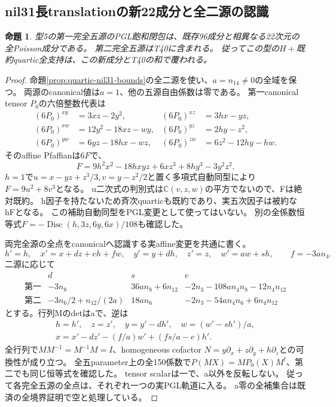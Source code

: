 \documentclass[a4paper,11pt]{ltjsarticle}
\newtheorem{proposition}{命題}[section]
\theoremstyle{definition}
\begin{document}
\subsection{nil31長translationの新22成分と全二源の認識}
\begin{proposition}\label{prop:nil31-long-quartic-component}
型5の第一完全五源のPGL飽和閉包は、既存96成分と相異なる22次元の全Poisson成分である。
第二完全五源はT40に含まれる。
従ってこの型の$H+$既約quartic全支持は、この新成分とT40の和で覆われる。
\end{proposition}
\begin{proof}
命題\ref{prop:quartic-nil31-bounds}の全二源を使い、$a=n_{14}\ne0$の全域を保つ。
両源のcanonical値は$a=1$、他の五源自由係数は零である。
第一canonical tensor $P_0$の六倍整数代表は
\[
\begin{aligned}
 (6P_0)^{xy}&=3xz-2y^2,&(6P_0)^{xz}&=3hx-yz,\\
 (6P_0)^{xw}&=12y^2-18xz-wy,&(6P_0)^{yz}&=2hy-z^2,\\
 (6P_0)^{yw}&=6yz-18hx-wz,&(6P_0)^{zw}&=6z^2-12hy-hw.
\end{aligned}
\]
そのaffine Pfaffianは$6F$で、
\[
 F=9h^2x^2-18hxyz+6xz^3+8hy^3-3y^2z^2.
\]
$h=1$で$u=x-yz+z^3/3,v=y-z^2/2$と置く多項式自動同型により$F=9u^2+8v^3$となる。
u二次式の判別式は$\mathbb C(v,z,w)$の平方でないので、Fは絶対既約。
h因子を持たないため斉次quarticも既約であり、実五次因子は被約なhFとなる。
この補助自動同型をPGL変更として使ってはいない。
別の全係数恒等式$F=-\operatorname{Disc}(h,3z,6y,6x)/108$も確認した。

両完全源の全点をcanonicalへ認識する実affine変更を共通に書く。
\[
 h'=h,\quad x'=x+dz+eh+fw,\quad y'=y+dh,\quad z'=z,\quad w'=aw+sh,
 \qquad f=-3an_4.
\]
二源に応じて
\[
\begin{array}{c|c|c|c}
 &d&s&e\\\hline
 \text{第一}&-3n_8&36an_8+6n_{12}&-2n_3-108an_4n_8-12n_4n_{12}\\
 \text{第二}&-3n_6/2+n_{12}/(2a)&18an_6&-2n_3-54an_4n_6+6n_4n_{12}
\end{array}
\]
とする。行列Mのdetはaで、逆は
\[
 \begin{gathered}
 h=h',\quad z=z',\quad y=y'-dh',\quad w=(w'-sh')/a,\\
 x=x'-dz'-(f/a)w'+(fs/a-e)h'.
 \end{gathered}
\]
全行列で$MM^{-1}=M^{-1}M=I$、homogeneous cofactor
$N=y\partial_x+z\partial_y+h\partial_z$との可換性が成り立つ。
全五parameter上の全150係数で$P(MX)=MP_0(X)M^t$、第二でも同じ恒等式を確認した。
tensor scalarは一で、a以外を反転しない。
従って各完全五源の全点は、それぞれ一つの実PGL軌道に入る。
a零の全補集合は既済の全境界証明で空と処理している。


\end{proof}
\end{document}
